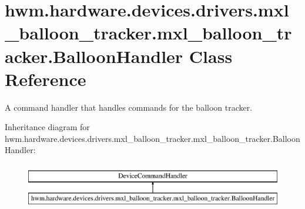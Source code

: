\hypertarget{classhwm_1_1hardware_1_1devices_1_1drivers_1_1mxl__balloon__tracker_1_1mxl__balloon__tracker_1_1_balloon_handler}{\section{hwm.\-hardware.\-devices.\-drivers.\-mxl\-\_\-balloon\-\_\-tracker.\-mxl\-\_\-balloon\-\_\-tracker.\-Balloon\-Handler Class Reference}
\label{classhwm_1_1hardware_1_1devices_1_1drivers_1_1mxl__balloon__tracker_1_1mxl__balloon__tracker_1_1_balloon_handler}
}


A command handler that handles commands for the balloon tracker.  


Inheritance diagram for hwm.\-hardware.\-devices.\-drivers.\-mxl\-\_\-balloon\-\_\-tracker.\-mxl\-\_\-balloon\-\_\-tracker.\-Balloon\-Handler\-:\begin{figure}[H]
\begin{center}
\leavevmode
\includegraphics[height=2.000000cm]{classhwm_1_1hardware_1_1devices_1_1drivers_1_1mxl__balloon__tracker_1_1mxl__balloon__tracker_1_1_balloon_handler}
\end{center}
\end{figure}
